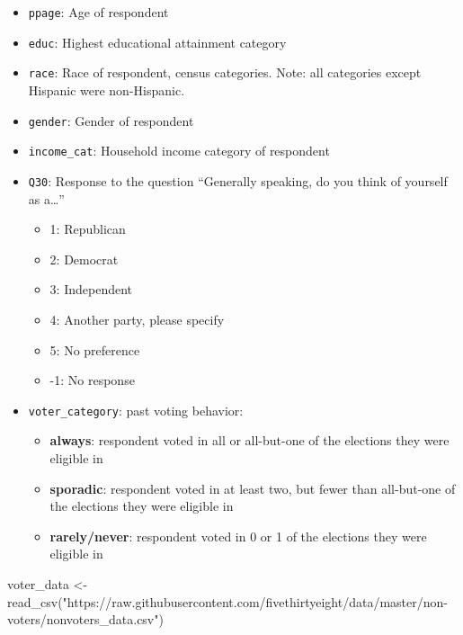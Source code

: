 \documentclass[
  letterpaper,
  DIV=11,
  numbers=noendperiod]{scrartcl}
\newenvironment{Shaded}{\begin{snugshade}}{\end{snugshade}}
\newcommand{\FunctionTok}[1]{\textcolor[rgb]{0.28,0.35,0.67}{#1}}
\newcommand{\NormalTok}[1]{\textcolor[rgb]{0.00,0.23,0.31}{#1}}
\newcommand{\OtherTok}[1]{\textcolor[rgb]{0.00,0.23,0.31}{#1}}
\newcommand{\StringTok}[1]{\textcolor[rgb]{0.13,0.47,0.30}{#1}}
\providecommand{\tightlist}{%
  \setlength{\itemsep}{0pt}\setlength{\parskip}{0pt}}
\begin{document}
\begin{itemize}
\item
  \texttt{ppage}: Age of respondent
\item
  \texttt{educ}: Highest educational attainment category
\item
  \texttt{race}: Race of respondent, census categories. Note: all
  categories except Hispanic were non-Hispanic.
\item
  \texttt{gender}: Gender of respondent
\item
  \texttt{income\_cat}: Household income category of respondent
\item
  \texttt{Q30}: Response to the question ``Generally speaking, do you
  think of yourself as a\ldots{}''

  \begin{itemize}
  \tightlist
  \item
    1: Republican
  \item
    2: Democrat
  \item
    3: Independent
  \item
    4: Another party, please specify
  \item
    5: No preference
  \item
    -1: No response
  \end{itemize}
\item
  \texttt{voter\_category}: past voting behavior:

  \begin{itemize}
  \tightlist
  \item
    \textbf{always}: respondent voted in all or all-but-one of the
    elections they were eligible in
  \item
    \textbf{sporadic}: respondent voted in at least two, but fewer than
    all-but-one of the elections they were eligible in
  \item
    \textbf{rarely/never}: respondent voted in 0 or 1 of the elections
    they were eligible in
  \end{itemize}
\end{itemize}

\begin{Shaded}
\begin{Highlighting}[]
\NormalTok{voter\_data }\OtherTok{\textless{}{-}} \FunctionTok{read\_csv}\NormalTok{(}\StringTok{"https://raw.githubusercontent.com/fivethirtyeight/data/master/non{-}voters/nonvoters\_data.csv"}\NormalTok{)}
\end{Highlighting}
\end{Shaded}
\end{document}
